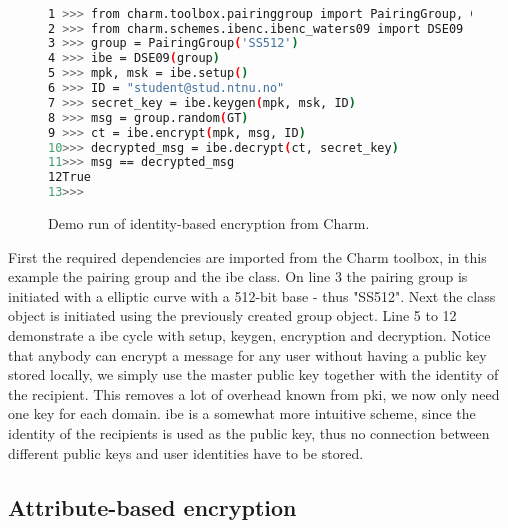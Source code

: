\begin{figure}[H]
\begin{lstlisting}[language=bash, frame=single, breaklines=true ]

1 >>> from charm.toolbox.pairinggroup import PairingGroup, GT
2 >>> from charm.schemes.ibenc.ibenc_waters09 import DSE09
3 >>> group = PairingGroup('SS512')
4 >>> ibe = DSE09(group)
5 >>> mpk, msk = ibe.setup()
6 >>> ID = "student@stud.ntnu.no"
7 >>> secret_key = ibe.keygen(mpk, msk, ID)
8 >>> msg = group.random(GT)
9 >>> ct = ibe.encrypt(mpk, msg, ID)
10>>> decrypted_msg = ibe.decrypt(ct, secret_key)
11>>> msg == decrypted_msg
12True
13>>> 

\end{lstlisting}
\caption{Demo run of identity-based encryption from Charm.}
\label{fig:ibenc}
\end{figure}

First the required dependencies are imported from the Charm toolbox, in this example the pairing group and the \gls{ibe} class. On line 3 the pairing group is initiated with a elliptic curve with a 512-bit base - thus "SS512". Next the class object is initiated using the previously created group object. Line 5 to 12 demonstrate a \gls{ibe} cycle with setup, keygen, encryption and decryption.
Notice that anybody can encrypt a message for any user without having a public key stored locally, we simply use the master public key together with the identity of the recipient. This removes a lot of overhead known from \gls{pki}, we now only need one key for each domain. \Gls{ibe} is a somewhat more intuitive scheme, since the identity of the recipients is used as the public key, thus no connection between different public keys and user identities have to be stored.

\subsection{Attribute-based encryption}\label{subsec:ABE}

